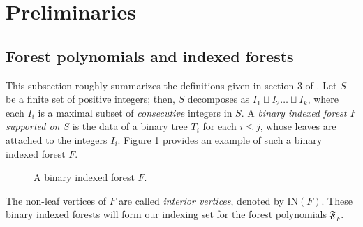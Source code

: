 \documentclass{article}
\theoremstyle{definition} %
\begin{document}
\section{Preliminaries}

\subsection{Forest polynomials and indexed forests}

This subsection roughly summarizes the definitions given in section $3$ of \cite{forestpolynomials1}. Let $S$ be a finite set of positive integers; then, $S$ decomposes as $I_1 \sqcup I_2 \dots \sqcup I_k$, where each $I_i$ is a maximal subset of \textit{consecutive} integers in $S$. A \textit{binary indexed forest $F$ supported on $S$} is the data of a binary tree $T_i$ for each $i \leq j$, whose leaves are attached to the integers $I_i$. Figure \ref{fig:example_forest} provides an example of such a binary indexed forest $F$.

\begin{figure}
\centering
    \caption{A binary indexed forest $F$.}
    \label{fig:example_forest}
\end{figure}


The non-leaf vertices of $F$ are called \textit{interior vertices}, denoted by $\text{IN}(F)$. These binary indexed forests will form our indexing set for the forest polynomials $\mathfrak{F}_F$. 
\end{document}
